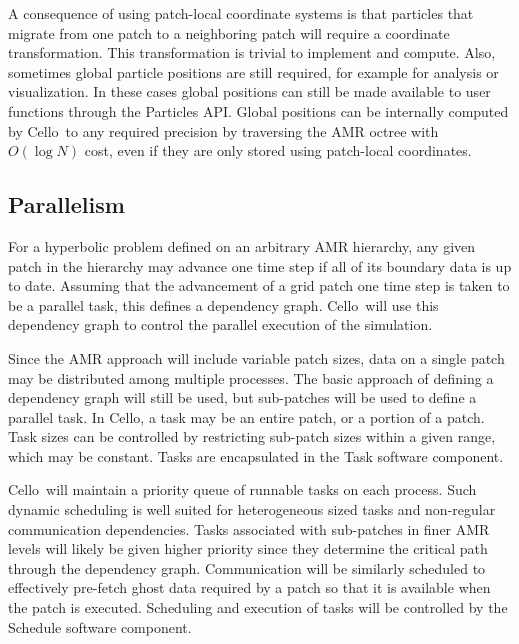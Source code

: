 \documentclass[11pt,letterpaper]{article}
\newcommand{\cello}{\textsf{Cello}}
\newcommand{\code}[1]{\textsf{#1}}
\begin{document}
A consequence of using patch-local coordinate systems is that
particles that migrate from one patch to a neighboring patch will
require a coordinate transformation.  This transformation is trivial
to implement and compute.  Also, sometimes global particle positions
are still required, for example for analysis or visualization.  In
these cases global positions can still be made available to user
functions through the \code{Particles} API.  Global positions can be
internally computed by \cello\ to any required precision by traversing
the AMR octree with $O(\log N)$ cost, even if they are only stored
using patch-local coordinates.

\subsection{Parallelism} \label{ss:design-parallel}

For a hyperbolic problem defined on an arbitrary AMR hierarchy, any
given patch in the hierarchy may advance one time step if all of its
boundary data is up to date.  Assuming that the advancement of a grid
patch one time step is taken to be a parallel task, this defines a
dependency graph.  \cello\ will use this dependency graph to control
the parallel execution of the simulation.

Since the AMR approach will include variable patch sizes, data on a
single patch may be distributed among multiple processes.  The basic
approach of defining a dependency graph will still be used, but
sub-patches will be used to define a parallel task.  In \cello, a task
may be an entire patch, or a portion of a patch.  Task sizes can be
controlled by restricting sub-patch sizes within a given range, which
may be constant.  Tasks are encapsulated in the \code{Task} software
component.

\cello\ will maintain a priority queue of runnable tasks on each
process.  Such dynamic scheduling is well suited for heterogeneous
sized tasks and non-regular communication dependencies. Tasks
associated with sub-patches in finer AMR levels will likely be given
higher priority since they determine the critical path through the
dependency graph.  Communication will be similarly scheduled to
effectively pre-fetch ghost data required by a patch so that it is
available when the patch is executed.  Scheduling and execution of
tasks will be controlled by the \code{Schedule} software component.
\end{document}
